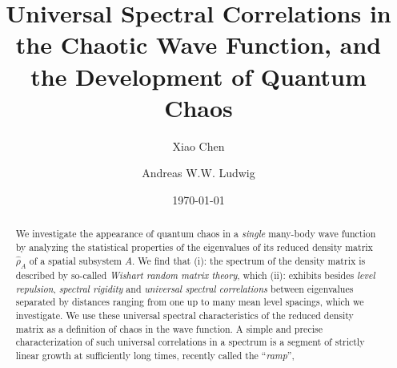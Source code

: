 \documentclass[aps,prb,preprint,onecolumn,amsmath,amssymb,superscriptaddress,eqsecnum,floatfix,scrartcl]{revtex4-1}
\begin{document}
\title{Universal Spectral Correlations  in the Chaotic Wave Function,
and the  
Development of Quantum Chaos}
\author{Xiao Chen}   

\author{Andreas W.W. Ludwig}


\date{\today} 




\begin{abstract}   
  We investigate the appearance of quantum chaos in a {\it single}  many-body wave function by analyzing
the statistical properties of
the  eigenvalues of 
its reduced density matrix ${\hat  \rho}_A$ of  a spatial  subsystem   $A$.  
We find  that  (i):  the spectrum of the density matrix is described by so-called {\it Wishart random matrix theory},  which
(ii): exhibits besides {\it level repulsion}, {\it spectral rigidity} and  {\it universal spectral correlations} between eigenvalues separated 
by distances
ranging from one  up to  many mean level spacings,   which we investigate.
We use these universal spectral characteristics of the reduced density matrix
as a definition of chaos in the wave function.
A simple and  precise characterization
of  such universal
correlations
in a spectrum
is  a segment of  strictly  linear growth at sufficiently  long times, 
recently 
called the ``{\it ramp}'',

\end{abstract}
\end{document}
